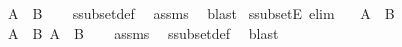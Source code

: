 \begin{isabellebody}
\ \ \ {\isachardoublequoteopen}A\ {\isasymsubset}\ B{\isachardoublequoteclose}\isanewline
%
\isadelimproof
\ \ %
\endisadelimproof
%
\isatagproof
{}\isamarkupfalse%
\ ssubset{\isacharunderscore}{\kern0pt}def\ \isamarkupfalse%
\ assms\ \isamarkupfalse%
\ blast%
\endisatagproof
{\isafoldproof}%
%
\isadelimproof
\isanewline
%
\endisadelimproof
\isanewline
{}\isamarkupfalse%
\ ssubsetE\ {\isacharbrackleft}{\kern0pt}elim{\isacharbrackright}{\kern0pt}{\isacharcolon}{\kern0pt}\isanewline
\ \ \ {\isachardoublequoteopen}A\ {\isasymsubset}\ B{\isachardoublequoteclose}\isanewline
\ \ \ {\isachardoublequoteopen}A\ {\isasymsubseteq}\ B{\isachardoublequoteclose}\ {\isachardoublequoteopen}A\ {\isasymnoteq}\ B{\isachardoublequoteclose}\isanewline
%
\isadelimproof
\ \ %
\endisadelimproof
%
\isatagproof
{}\isamarkupfalse%
\ assms\ \isamarkupfalse%
\ ssubset{\isacharunderscore}{\kern0pt}def\ \isamarkupfalse%
\ blast%
\endisatagproof
{\isafoldproof}%
%
\isadelimproof
\isanewline
%
\endisadelimproof
\isanewline
\isanewline
%
\isadelimtheory
\isanewline
%
\endisadelimtheory
%
\isatagtheory
{}\isamarkupfalse%
%
\endisatagtheory
{\isafoldtheory}%
%
\isadelimtheory
%
\endisadelimtheory
%
\end{isabellebody}%
\endinput
